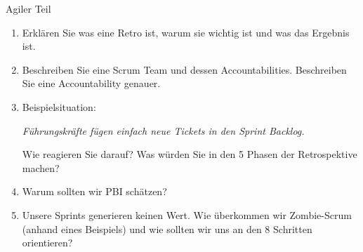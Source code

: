 \documentclass{article}
\begin{document}
\begin{exercise}{Agiler Teil}
  \begin{enumerate}
    \item Erklären Sie was eine Retro ist, warum sie wichtig ist und was das Ergebnis ist.
    \item Beschreiben Sie eine Scrum Team und dessen Accountabilities. Beschreiben Sie eine Accountability genauer.
    \item Beispielsituation:
          \par \textit{Führungskräfte fügen einfach neue Tickets in den Sprint Backlog.}
          \par Wie reagieren Sie darauf? Was würden Sie in den 5 Phasen der Retrospektive machen?
    \item Warum sollten wir PBI schätzen?
    \item Unsere Sprints generieren keinen Wert. Wie überkommen wir Zombie-Scrum (anhand eines Beispiels) und wie sollten wir uns an den 8 Schritten orientieren?
  \end{enumerate}


\end{exercise}
\end{document}
